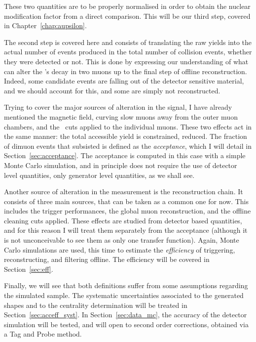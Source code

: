 These two quantities are to be properly normalised in order to obtain
the nuclear modification factor from a direct comparison. This will be
our third step, covered in Chapter~\ref{chap:aupsilon}.

The second step is covered here and consists of translating the raw yields into the
actual number of events produced in the total number of collision
events, whether they were detected or not. This is done by expressing our understanding of what
can alter the \PgU's decay in two muons up to the final step of offline
reconstruction. Indeed, some candidate events are falling out of
the detector sensitive material, and we should account for this, and
some are simply not reconstructed.

Trying to cover the major sources of alteration in the
signal, I have already mentioned the magnetic field, curving slow muons
away from the outer muon chambers, and the \pt\ cuts applied to
the individual muons. These two effects act in the same manner: the total
accessible yield is constrained, reduced. The fraction of dimuon
events that subsisted is defined as the \textit{acceptance}, which
I will detail in Section~\ref{sec:acceptance}. The acceptance is computed in
this case with a simple Monte Carlo simulation, and in principle does
not require the use of detector level quantities, only generator level
quantities, as we shall see.

Another source of alteration in the measurement is the reconstruction
chain. It consists of three main sources, that can be taken as a
common one
for now. This includes the trigger performances, the global muon
reconstruction, and the offline cleaning cuts applied. These effects
are studied from detector based quantities, and for this reason I will
treat them separately from the acceptance (although it is not
unconceivable to see them as only one transfer function). Again,
Monte Carlo simulations are used, this time to estimate the
\textit{efficiency} of triggering, reconstructing, and filtering
offline. The efficiency will be covered in Section~\ref{sec:eff}.

Finally, we will see that both definitions suffer from some
assumptions regarding the simulated sample. The systematic
uncertainties associated to the generated shapes and to the centrality
determination will be treated in Section~\ref{sec:acceff_syst}. In
Section~\ref{sec:data_mc}, the accuracy of the detector simulation
will be tested, and
will open to second order corrections, obtained via a Tag and Probe
method.

